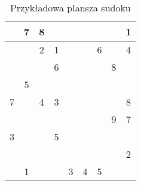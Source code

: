 \begin{table}[htbp]
\centering 
\begin{tabular}{||c|c|c||c|c|c||c|c|c||}
\hline \hline
 & 7 & 8 &  &  &  &  &  & 1 \\ \hline
 &  & 2 & 1 &  &  & 6 &  & 4 \\ \hline
 &  &  & 6 &  &  &  & 8 &  \\ \hline \hline
 & 5 &  &  &  &  &  &  &  \\ \hline
7 &  & 4 & 3 &  &  &  &  & 8 \\ \hline
 &  &  &  &  &  &  & 9 & 7 \\ \hline \hline
3 &  &  & 5 &  &  &  &  &  \\ \hline
 &  &  &  &  &  &  &  & 2 \\ \hline
 & 1 &  &  & 3 & 4 & 5 &  &  \\ \hline \hline
\end{tabular} 
\label{tab:sudokutabela}
\caption{Przykładowa plansza sudoku}
\end{table}